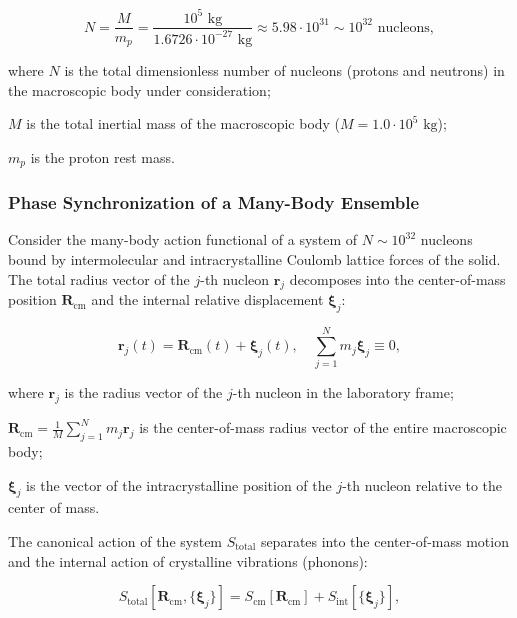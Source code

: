\begin{equation}\label{eq:5.2}\tag{5.2}
N = \frac{M}{m_p} = \frac{10^5\text{ kg}}{1.6726 \cdot 10^{-27}\text{ kg}} \approx 5.98 \cdot 10^{31} \sim 10^{32}\text{ nucleons},
\end{equation}

where $N$ is the total dimensionless number of nucleons (protons and neutrons) in the macroscopic body under consideration;  

$M$ is the total inertial mass of the macroscopic body ($M = 1.0 \cdot 10^5\text{ kg}$);  

$m_p$ is the proton rest mass.

\subsubsection{Phase Synchronization of a Many-Body Ensemble}\label{sec:5.1.2}

Consider the many-body action functional of a system of $N \sim 10^{32}$ nucleons bound by intermolecular and intracrystalline Coulomb lattice forces of the solid. The total radius vector of the $j$-th nucleon $\mathbf{r}_j$ decomposes into the center-of-mass position $\mathbf{R}_{\text{cm}}$ and the internal relative displacement $\boldsymbol{\xi}_j$:

\begin{equation}\label{eq:5.3}\tag{5.3}
\mathbf{r}_j(t) = \mathbf{R}_{\text{cm}}(t) + \boldsymbol{\xi}_j(t), \quad \sum_{j=1}^N m_j \boldsymbol{\xi}_j \equiv 0,
\end{equation}

where $\mathbf{r}_j$ is the radius vector of the $j$-th nucleon in the laboratory frame;  

$\mathbf{R}_{\text{cm}} = \frac{1}{M}\sum_{j=1}^N m_j \mathbf{r}_j$ is the center-of-mass radius vector of the entire macroscopic body;  

$\boldsymbol{\xi}_j$ is the vector of the intracrystalline position of the $j$-th nucleon relative to the center of mass.

The canonical action of the system $S_{\text{total}}$ separates into the center-of-mass motion and the internal action of crystalline vibrations (phonons):

\begin{equation}\label{eq:5.4}\tag{5.4}
S_{\text{total}}[\mathbf{R}_{\text{cm}}, \{\boldsymbol{\xi}_j\}] = S_{\text{cm}}[\mathbf{R}_{\text{cm}}] + S_{\text{int}}[\{\boldsymbol{\xi}_j\}],
\end{equation}

